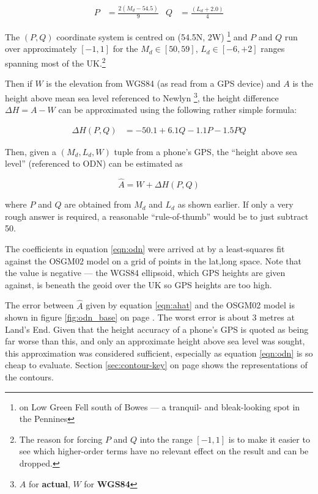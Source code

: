 \documentclass[10pt,a4paper]{article}
\begin{document}
\begin{align}
  P & = \frac{2\left(M_d - 54.5\right)}{9} & 
  Q & = \frac{\left(L_d + 2.0\right)}{4}
\end{align}

The $(P,Q)$ coordinate system is centred on (54.5\degree{}N, 2\degree{}W)
\footnote{on Low Green Fell south of Bowes --- a tranquil- and bleak-looking
spot in the Pennines}
and $P$ and $Q$ run over approximately $[-1,1]$ for the $M_d \in [50,59]$, $L_d
\in [-6,+2]$ ranges spanning most of the UK.\footnote{The reason for forcing
$P$ and $Q$ into the range $[-1,1]$ is to make it easier to see which
higher-order terms have no relevant effect on the result and can be dropped.}

Then if $W$ is the elevation from WGS84 (as read from a GPS device) and $A$ is
the height above mean sea level referenced to Newlyn
\footnote{$A$ for \textbf{actual}, $W$ for \textbf{WGS84}},
the height difference $\Delta H = A-W$ can be approximated using the following
rather simple formula:

\begin{align}
  \Delta H(P,Q) &= -50.1 + 6.1Q - 1.1P - 1.5 PQ
  \label{eqn:odn}
\end{align}

Then, given a $(M_d,L_d,W)$ tuple from a phone's GPS, the ``height above sea
level'' (referenced to ODN) can be estimated as

\begin{equation}
\hat{A} = W + \Delta H(P,Q)
\label{eqn:ahat}
\end{equation}

where $P$ and $Q$ are obtained from $M_d$ and $L_d$ as shown earlier.  If only
a very rough answer is required, a reasonable ``rule-of-thumb'' would be to
just subtract 50.

The coefficients in equation \eqref{eqn:odn} were arrived at by a least-squares
fit against the OSGM02 model on a grid of points in the lat,long space.  Note
that the value is negative --- the WGS84 ellipsoid, which GPS heights are given
against, is beneath the geoid over the UK so GPS heights are too high.

The error between $\hat{A}$ given by equation \eqref{eqn:ahat} and the OSGM02
model is shown in figure \ref{fig:odn_base} on page \pageref{fig:odn_base}.  The worst
error is about 3 metres at Land's End.  Given that the height accuracy of a
phone's GPS is quoted as being far worse than this, and only an approximate
height above sea level was sought, this approximation was considered
sufficient, especially as equation \eqref{eqn:odn} is so cheap to evaluate.
Section \ref{sec:contour-key} on page \pageref{sec:contour-key} shows the
representations of the contours.
\end{document}
